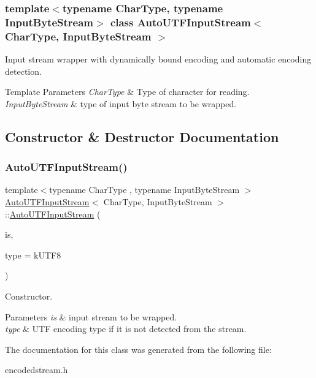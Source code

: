 \subsubsection*{template$<$typename Char\+Type, typename Input\+Byte\+Stream$>$\newline
class Auto\+U\+T\+F\+Input\+Stream$<$ Char\+Type, Input\+Byte\+Stream $>$}

Input stream wrapper with dynamically bound encoding and automatic encoding detection. 


\begin{DoxyTemplParams}{Template Parameters}
{\em Char\+Type} & Type of character for reading. \\
\hline
{\em Input\+Byte\+Stream} & type of input byte stream to be wrapped. \\
\hline
\end{DoxyTemplParams}


\subsection{Constructor \& Destructor Documentation}
\mbox{\label{a02136_a83837fced0971ba26dd9a8ec1575abb0}} 
\subsubsection{\texorpdfstring{Auto\+U\+T\+F\+Input\+Stream()}{AutoUTFInputStream()}}
{\footnotesize\ttfamily template$<$typename Char\+Type , typename Input\+Byte\+Stream $>$ \\
\hyperlink{a02136}{Auto\+U\+T\+F\+Input\+Stream}$<$ Char\+Type, Input\+Byte\+Stream $>$\+::\hyperlink{a02136}{Auto\+U\+T\+F\+Input\+Stream} (\begin{DoxyParamCaption}\item[{Input\+Byte\+Stream \&}]{is,  }\item[{U\+T\+F\+Type}]{type = {\ttfamily kUTF8} }\end{DoxyParamCaption})\hspace{0.3cm}{\ttfamily [inline]}}



Constructor. 


\begin{DoxyParams}{Parameters}
{\em is} & input stream to be wrapped. \\
\hline
{\em type} & U\+TF encoding type if it is not detected from the stream. \\
\hline
\end{DoxyParams}


The documentation for this class was generated from the following file\+:\begin{DoxyCompactItemize}
\item 
encodedstream.\+h\end{DoxyCompactItemize}

